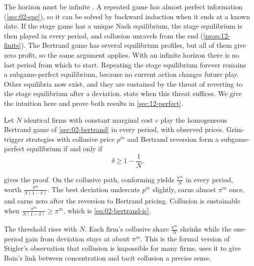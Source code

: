 The horizon must be infinite \citep[sec.~11.3.2]{Tirole1988}. A repeated game has almost perfect information
(\cref{sec:02-spe}), so it can be solved by backward induction when it ends at a known date. If the stage game has a
unique Nash equilibrium, the stage equilibrium is then played in every period, and collusion unravels from the end
(\cref{prop:12-finite}). The Bertrand game has several equilibrium profiles, but all of them give zero profit, so the
same argument applies. With an infinite horizon there is no last period from which to start. Repeating the stage
equilibrium forever remains a subgame-perfect equilibrium, because no current action changes future play. Other
equilibria now exist, and they are sustained by the threat of reverting to the stage equilibrium after a deviation.
 state when this threat suffices. We give the intuition
here and prove both results in \cref{sec:12-perfect}.

\begin{proposition}\label{prop:02-bertrand-collusion}
Let $N$ identical firms with constant marginal cost $c$ play the homogeneous Bertrand game of \cref{sec:02-bertrand}
in every period, with observed prices. Grim-trigger strategies with collusive price $p^m$ and Bertrand reversion form
a subgame-perfect equilibrium if and only if
\begin{equation}\label{eq:02-bertrand-ic}
\delta \ge 1 - \frac{1}{N} .
\end{equation}
\end{proposition}

 gives the proof. On the collusive path, conforming yields $\frac{\pi^m}{N}$ in every period,
worth $\frac{\pi^m}{N(1 - \delta)}$. The best deviation undercuts $p^m$ slightly, earns almost $\pi^m$ once, and
earns zero after the reversion to Bertrand pricing. Collusion is sustainable when $\frac{\pi^m}{N(1 - \delta)} \ge
\pi^m$, which is \eqref{eq:02-bertrand-ic}.

The threshold rises with $N$. Each firm's collusive share $\frac{\pi^m}{N}$ shrinks while the one-period gain from
deviation stays at about $\pi^m$. This is the formal version of Stigler's observation that collusion is impossible
for many firms. \citet[sec.~6.3.2.1]{Tirole1988} uses it to give Bain's link between concentration and tacit
collusion a precise sense.

